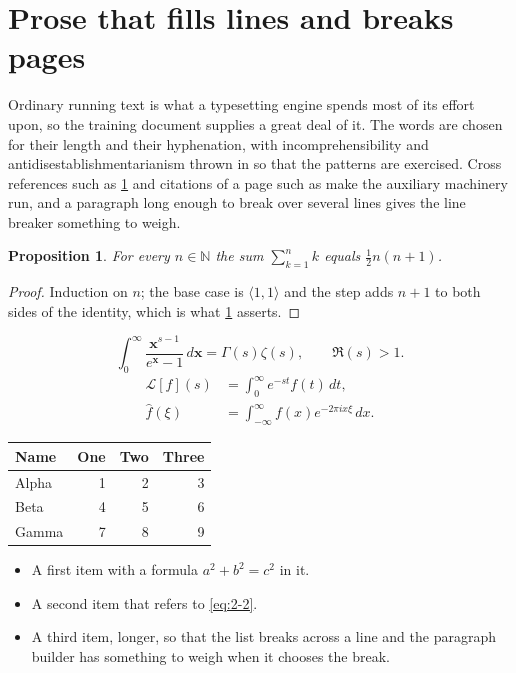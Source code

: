 \documentclass[11pt,a4paper]{report}
\theoremstyle{plain}
\newtheorem{proposition}{Proposition}[chapter]
\newcommand{\vecn}[1]{\mathbf{#1}}
\newcommand{\pairs}[2]{\langle #1,#2\rangle}
\begin{document}
\section{Prose that fills lines and breaks pages}
\label{sec:prose2-2}
Ordinary running text is what a typesetting engine spends most of its effort
upon, so the training document supplies a great deal of it. The words are
chosen for their length and their hyphenation, with incomprehensibility and
antidisestablishmentarianism thrown in so that the patterns are exercised.
Cross references such as \cref{sec:prose2-2} and citations of a page such
as \pageref{sec:prose2-2} make the auxiliary machinery run, and a
paragraph long enough to break over several lines gives the line breaker
something to weigh.
\begin{proposition}\label{prop:2-2}
For every $n\in\mathbb{N}$ the sum $\sum_{k=1}^{n}k$ equals
$\tfrac{1}{2}n(n+1)$.
\end{proposition}
\begin{proof}
Induction on $n$; the base case is $\pairs{1}{1}$ and the step adds $n+1$ to
both sides of the identity, which is what \cref{prop:2-2} asserts.
\end{proof}
\begin{equation}\label{eq:2-2}
  \int_{0}^{\infty}\frac{\vecn{x}^{s-1}}{e^{\vecn{x}}-1}\,d\vecn{x}
    = \Gamma(s)\zeta(s),\qquad \Re(s)>1 .
\end{equation}
\begin{align}
  \mathcal{L}[f](s) &= \int_{0}^{\infty} e^{-st} f(t)\,dt, \\
  \widehat{f}(\xi)  &= \int_{-\infty}^{\infty} f(x) e^{-2\pi i x\xi}\,dx .
\end{align}
\par\noindent\begin{center}
\begin{tabular}{lrrr}
\hline
Name & One & Two & Three \\
\hline
Alpha & 1 & 2 & 3 \\
Beta & 4 & 5 & 6 \\
Gamma & 7 & 8 & 9 \\
\hline
\end{tabular}
\end{center}
\begin{itemize}
  \item A first item with a formula $a^2+b^2=c^2$ in it.
  \item A second item that refers to \eqref{eq:2-2}.
  \item A third item, longer, so that the list breaks across a line and the
    paragraph builder has something to weigh when it chooses the break.
\end{itemize}
\end{document}
